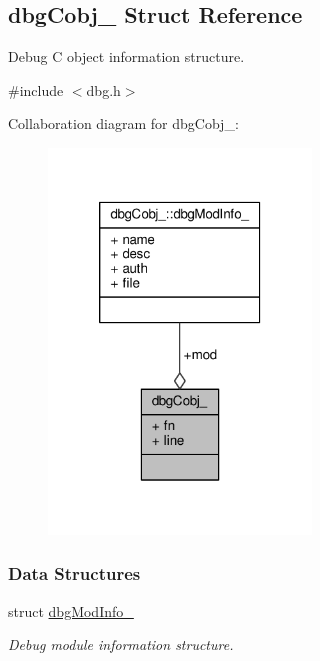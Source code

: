 \hypertarget{structdbgCobj__}{\subsection{dbg\-Cobj\-\_\- Struct Reference}
\label{structdbgCobj__}
}


Debug C object information structure.  




{\ttfamily \#include $<$dbg.\-h$>$}



Collaboration diagram for dbg\-Cobj\-\_\-\-:\nopagebreak
\begin{figure}[H]
\begin{center}
\leavevmode
\includegraphics[width=198pt]{structdbgCobj____coll__graph}
\end{center}
\end{figure}
\subsubsection*{Data Structures}
\begin{DoxyCompactItemize}
\item 
struct \hyperlink{structdbgCobj___1_1dbgModInfo__}{dbg\-Mod\-Info\-\_\-}
\begin{DoxyCompactList}\small\item\em Debug module information structure. \end{DoxyCompactList}\end{DoxyCompactItemize}
